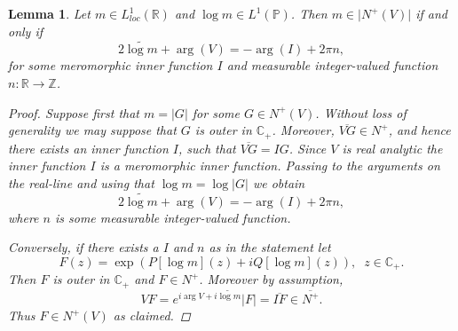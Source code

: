 \documentclass{article}[12pt]
\newtheorem{lemma}{Lemma}
\theoremstyle{remark}
\begin{document}
\begin{lemma}\label{lemma:modulus_of_Smirnov_class}
            Let $m \in L^{1}_{loc}(\mathbb{R})$ and $\log m \in L^{1}(\mathbb{P})$. Then $m \in \lvert N^{+}(V) \rvert$ if and only if
            \begin{equation*}
                2 \widetilde{\log m} + \arg(V) = -\arg(I) + 2\pi n,
            \end{equation*}
            for some meromorphic inner function $I$ and measurable integer-valued function $n : \mathbb{R} \to \mathbb{Z}$.
            \begin{proof}
                Suppose first that $m = \lvert G \rvert$ for some $G \in N^{+}(V)$. Without loss of generality we may suppose that $G$ is outer in $\mathbb{C}_{+}$. Moreover, $\overline{VG} \in N^{+}$, and hence there exists an inner function $I$, such that $\overline{VG} = IG$. Since $V$ is real analytic the inner function $I$ is a meromorphic inner function. Passing to the arguments on the real-line and using that $\log m = \log \lvert G \rvert$ we obtain
                \begin{equation*}
                    2 \widetilde{\log m} + \arg(V)= -\arg(I) + 2\pi n,
                \end{equation*}
                where $n$ is some measurable integer-valued function.

                Conversely, if there exists a $I$ and $n$ as in the statement let
                \begin{equation*}
                    F(z) = \exp\left( P[\log m](z) + iQ[\log m](z) \right), \; \; z \in \mathbb{C}_{+}.
                \end{equation*}
                Then $F$ is outer in $\mathbb{C}_{+}$ and $F \in N^{+}$. Moreover by assumption,
                \begin{equation*}
                    VF = e^{i\arg V + i\widetilde{\log m}}\lvert F \rvert = \overline{IF} \in \overline{N^{+}}. 
                \end{equation*}
                Thus $F \in N^{+}(V)$ as claimed.
            \end{proof}    
        \end{lemma}
\end{document}
